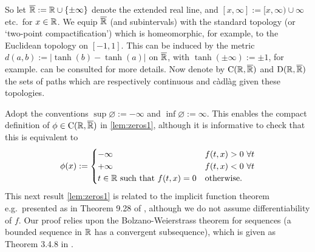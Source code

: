 So let ${\overline{\mathbb{R}}}:=\mathbb{R}\cup\{\pm\infty\}$ denote the extended real line, and $[x,\infty]:=[x,\infty)\cup\infty$ etc.~for $x\in\mathbb{R}$. We equip ${\overline{\mathbb{R}}}$ (and subintervals) with the standard topology (or `two-point compactification') which is homeomorphic, for example, to the Euclidean topology on $[-1,1]$. This can be induced by the metric $d(a,b):=|\tanh(b)-\tanh(a)|$ on ${\overline{\mathbb{R}}}$, with $\tanh(\pm\infty):=\pm 1$, for example. \cite{aliprantis_1998} can be consulted for more details. Now denote by $\mathrm{C}(\mathbb{R},{\overline{\mathbb{R}}})$ and $\mathrm{D}(\mathbb{R},{\overline{\mathbb{R}}})$ the sets of paths which are respectively continuous and c\`adl\`ag given these topologies.

Adopt the conventions $\sup\varnothing:=-\infty$ and $\inf\varnothing:=\infty$. This enables the compact definition of $\phi\in\mathrm{C}(\mathbb{R},{\overline{\mathbb{R}}})$ in \autoref{lem:zeros1}, although it is informative to check that this is equivalent to
\begin{equation}\label{eq:define_phi_alt}
\phi(x) :=
\begin{cases}
    -\infty & f(t,x)>0\ \forall t \\
    +\infty & f(t,x)<0\ \forall t \\
    t\in\mathbb{R} \text{ such that } f(t,x)=0 & \text{otherwise}.
\end{cases}
\end{equation}
This next result \autoref{lem:zeros1} is related to the implicit function theorem e.g.~presented as in Theorem 9.28 of \cite{rudin_1976}, although we do not assume differentiability of $f$. Our proof relies upon the Bolzano-Weierstrass theorem for sequences (a bounded sequence in $\mathbb{R}$ has a convergent subsequence), which is given as Theorem 3.4.8 in \cite{bartle_2011}.

